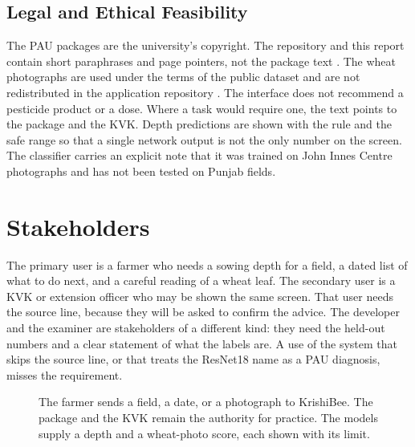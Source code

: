 \subsection{Legal and Ethical Feasibility}
The PAU packages are the university's copyright. The repository and this report contain short paraphrases and page pointers, not the package text \cite{pau2025rabi,pau2026kharif}. The wheat photographs are used under the terms of the public dataset and are not redistributed in the application repository \cite{long2023data}. The interface does not recommend a pesticide product or a dose. Where a task would require one, the text points to the package and the KVK. Depth predictions are shown with the rule and the safe range so that a single network output is not the only number on the screen. The classifier carries an explicit note that it was trained on John Innes Centre photographs and has not been tested on Punjab fields.

\section{Stakeholders}
The primary user is a farmer who needs a sowing depth for a field, a dated list of what to do next, and a careful reading of a wheat leaf. The secondary user is a KVK or extension officer who may be shown the same screen. That user needs the source line, because they will be asked to confirm the advice. The developer and the examiner are stakeholders of a different kind: they need the held-out numbers and a clear statement of what the labels are. A use of the system that skips the source line, or that treats the ResNet18 name as a PAU diagnosis, misses the requirement.

\begin{figure}[H]
\centering
{}
\caption{The farmer sends a field, a date, or a photograph to KrishiBee. The package and the KVK remain the authority for practice. The models supply a depth and a wheat-photo score, each shown with its limit.}
\label{fig:stakeholders}
\end{figure}


